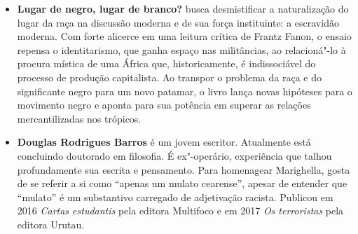 \begin{itemize}


\item \textbf{Lugar de negro, lugar de branco?} busca desmistificar a naturalização do lugar da raça na discussão moderna e de sua força instituinte: a escravidão moderna. Com forte alicerce em uma leitura crítica de Frantz Fanon, o ensaio repensa o identitarismo, que ganha espaço nas militâncias, ao relacioná"-lo à procura mística de uma África que, historicamente, é indissociável do processo de produção capitalista.
 Ao transpor o problema da raça e do significante negro para um novo patamar, o livro lança novas hipóteses para o movimento negro e aponta para sua potência em superar as relações mercantilizadas nos trópicos.
  
\item \textbf{Douglas Rodrigues Barros} é um jovem escritor. Atualmente está concluindo doutorado
em filosofia. É ex"-operário, experiência que talhou profundamente sua escrita e
pensamento. Para homenagear Marighella, gosta de se referir a si como ``apenas um
mulato cearense'', apesar de entender que ``mulato'' é um substantivo carregado de
adjetivação racista. Publicou em 2016 \emph{Cartas estudantis} pela editora Multifoco e em
2017 \emph{Os terroristas} pela editora Urutau. 

\end{itemize}